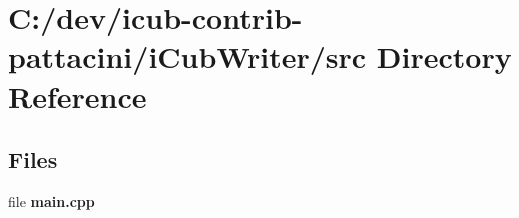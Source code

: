 \section{C\+:/dev/icub-\/contrib-\/pattacini/i\+Cub\+Writer/src Directory Reference}
\label{dir_2ee165db7b46aaa62103dbb0d55277c8}
\subsection*{Files}
\begin{DoxyCompactItemize}
\item 
file {\bfseries main.\+cpp}
\end{DoxyCompactItemize}
